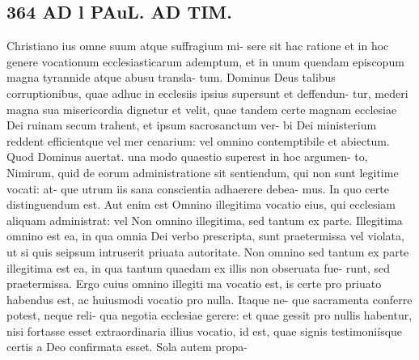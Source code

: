 \documentclass{article}
\begin{document}
\begin{pages}
\section*{364 AD l PAuL. AD TIM. }Christiano ius omne suum atque suffragium mi- sere sit hac ratione et in hoc genere vocationum ecclesiasticarum ademptum, et in unum quendam episcopum magna tyrannide atque abusu transla- tum. Dominus Deus talibus corruptionibus, quae adhuc in ecclesiis ipsius supersunt et deffendun- tur, mederi magna sua misericordia dignetur et velit, quae tandem certe magnam ecclesiae Dei ruinam secum trahent, et ipsum sacrosanctum ver- bi Dei ministerium reddent efficientque vel mer cenarium: vel omnino contemptibile et abiectum. Quod Dominus auertat. una modo quaestio superest in hoc argumen- to, Nimirum, quid de eorum administratione sit sentiendum, qui non sunt legitime vocati: at- que utrum iis sana conscientia adhaerere debea- mus. In quo certe distinguendum est. Aut enim est Omnino illegitima vocatio eius, qui ecclesiam aliquam administrat: vel Non omnino illegitima, sed tantum ex parte. Illegitima omnino est ea, in qua omnia Dei verbo prescripta, sunt praetermissa vel violata, ut si quis seipsum intruserit priuata autoritate. Non omnino sed tantum ex parte illegitima est ea, in qua tantum quaedam ex illis non obseruata fue- runt, sed praetermissa. Ergo cuius omnino illegiti ma vocatio est, is certe pro priuato habendus est, ac huiusmodi vocatio pro nulla. Itaque ne- que sacramenta conferre potest, neque reli- qua negotia ecclesiae gerere: et quae gessit pro nullis habentur, nisi fortasse esset extraordinaria illius vocatio, id est, quae signis testimoniísque certis a Deo confirmata esset. Sola autem propa- 

\end{pages}
\end{document}
